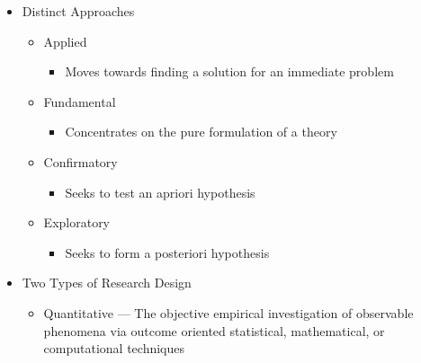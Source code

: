 \begin{itemize}
  \item Distinct Approaches

    \begin{itemize}

      \item Applied

        \begin{itemize}

          \item Moves towards finding a solution for an immediate problem

        \end{itemize}

      \item Fundamental

        \begin{itemize}

          \item Concentrates on the pure formulation of a theory

        \end{itemize}

      \item Confirmatory

        \begin{itemize}

          \item Seeks to test an apriori hypothesis

        \end{itemize}

      \item Exploratory

        \begin{itemize}

          \item Seeks to form a posteriori hypothesis

        \end{itemize}

    \end{itemize}

  \item Two Types of Research Design

    \begin{itemize}

      \item Quantitative — The objective empirical investigation of observable phenomena via outcome oriented statistical, mathematical, or computational techniques

        \begin{itemize}


\end{itemize}
\end{itemize}
\end{itemize}
